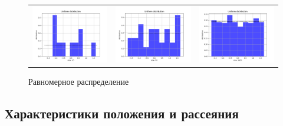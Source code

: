 \documentclass[../main.tex]{subfiles}
\begin{document}
	\begin{figure}[H]
		\centering
		\begin{tabular}{ccc}
			\includegraphics[width=55mm, height =0.25\textheight]{figures/uniform_10.png} 
			&
			\includegraphics[width=55mm, height =0.25\textheight]{figures/uniform_50.png}
			&
			\includegraphics[width=55mm, height =0.25\textheight]{figures/uniform_1000.png}
		\end{tabular}
		\caption{Равномерное распределение} 
		\label{fig:normal}
	\end{figure}
	
	\subsection{Характеристики положения и рассеяния}
	
\end{document}
